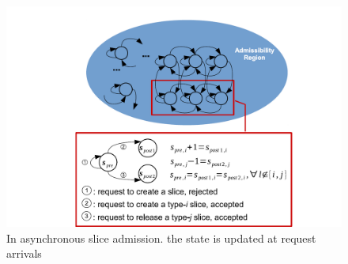 \documentclass{beamer}
\begin{document}
\begin{frame}[fragile]
\frametitle{}
\begin{figure}
    \includegraphics[scale=0.34]{fig-research.png}
    \caption{In asynchronous slice admission. the state is updated at request arrivals}
\end{figure}
\end{frame}
\end{document}
